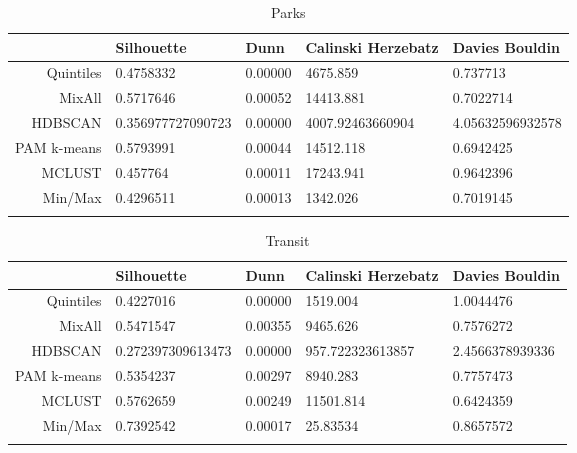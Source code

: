 \documentclass[10pt, a4paper]{article}
\begin{document}
\begin{longtable}{rllll}
  \hline
 & Silhouette & Dunn & Calinski Herzebatz & Davies Bouldin \\ 
  \hline
Quintiles & 0.4758332 & 0.00000 & 4675.859 & 0.737713 \\ 
   \hline
MixAll & 0.5717646 & 0.00052 & 14413.881 & 0.7022714 \\ 
   \hline
HDBSCAN & 0.356977727090723 & 0.00000 & 4007.92463660904 & 4.05632596932578 \\ 
   \hline
PAM k-means & 0.5793991 & 0.00044 & 14512.118 & 0.6942425 \\ 
   \hline
MCLUST & 0.457764 & 0.00011 & 17243.941 & 0.9642396 \\ 
   \hline
Min/Max & 0.4296511 & 0.00013 & 1342.026 & 0.7019145 \\ 
   \hline
\hline
\caption{Parks} 
\end{longtable}





 \pagebreak 
 
\begin{longtable}{rllll}
  \hline
 & Silhouette & Dunn & Calinski Herzebatz & Davies Bouldin \\ 
  \hline
Quintiles & 0.4227016 & 0.00000 & 1519.004 & 1.0044476 \\ 
   \hline
MixAll & 0.5471547 & 0.00355 & 9465.626 & 0.7576272 \\ 
   \hline
HDBSCAN & 0.272397309613473 & 0.00000 & 957.722323613857 & 2.4566378939336 \\ 
   \hline
PAM k-means & 0.5354237 & 0.00297 & 8940.283 & 0.7757473 \\ 
   \hline
MCLUST & 0.5762659 & 0.00249 & 11501.814 & 0.6424359 \\ 
   \hline
Min/Max & 0.7392542 & 0.00017 & 25.83534 & 0.8657572 \\ 
   \hline
\hline
\caption{Transit} 
\end{longtable}





 \pagebreak 
 




 
\end{document}
